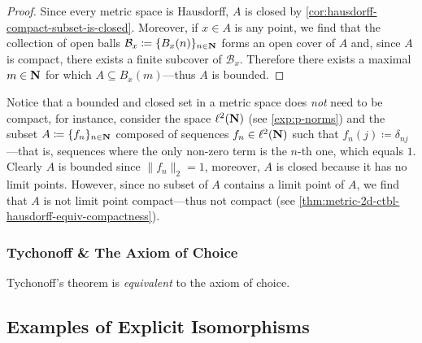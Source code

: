 \begin{proof}
Since every metric space is Hausdorff, \(A\) is closed by
\cref{cor:hausdorff-compact-subset-is-closed}. Moreover, if \(x \in A\) is any
point, we find that the collection of open balls
\(\mathcal{B}_x \coloneq \{B_x(n)\}_{n \in \mathbf{N}}\) forms an open cover of \(A\)
and, since \(A\) is compact, there exists a finite subcover of
\(\mathcal{B}_x\). Therefore there exists a maximal \(m \in \mathbf{N}\) for which
\(A \subseteq B_x(m)\)---thus \(A\) is bounded.
\end{proof}

\begin{remark}
\label{rem:closed-and-bounded-not-compact}
Notice that a bounded and closed set in a metric space does \emph{not} need to
be compact, for instance, consider the space \(\ell^2(\mathbf{N})\) (see
\cref{exp:p-norms}) and the subset \(A \coloneq \{f_n\}_{n \in \mathbf{N}}\) composed of
sequences \(f_n \in \ell^2(\mathbf{N})\) such that
\(f_n(j) \coloneq \delta_{n j}\)---that is, sequences where the only non-zero
term is the \(n\)-th one, which equals \(1\). Clearly \(A\) is bounded since
\(\| f_{n} \|_2 = 1\), moreover, \(A\) is closed because it has no limit
points. However, since no subset of \(A\) contains a limit point of \(A\), we
find that \(A\) is not limit point compact---thus not compact (see
\cref{thm:metric-2d-ctbl-hausdorff-equiv-compactness}).
\end{remark}

\subsubsection{Tychonoff \& The Axiom of Choice}

\begin{theorem}
\label{thm:tychonoff-equivalent-choice}
Tychonoff's theorem is \emph{equivalent} to the axiom of choice.
\end{theorem}


\subsection{Examples of Explicit Isomorphisms}

